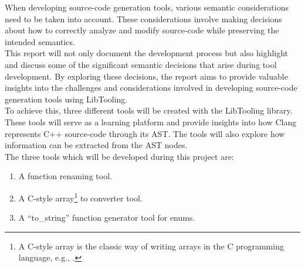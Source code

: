 When developing source-code generation tools, various semantic considerations need to be taken into account.
These considerations involve making decisions about how to correctly analyze and modify source-code while preserving the intended semantics.\\
This report will not only document the development process but also highlight and discuss some of the significant semantic decisions that arise during tool development.
By exploring these decisions, the report aims to provide valuable insights into the challenges and considerations involved in developing source-code generation tools using LibTooling.\\
To achieve this, three different tools will be created with the LibTooling library.
These tools will serve as a learning platform and provide insights into how Clang represents C++ source-code through its AST. The tools will also explore how information can be extracted from the AST nodes.\\
The three tools which will be developed during this project are:
\vspace*{-0.75em}
\begin{enumerate}
    \item A function renaming tool.
    \item A C-style array\footnote{A C-style array is the classic way of writing arrays in the C programming language, e.g., .} to  converter tool.
    \item A ``to\_string'' function generator tool for enums.
\end{enumerate}